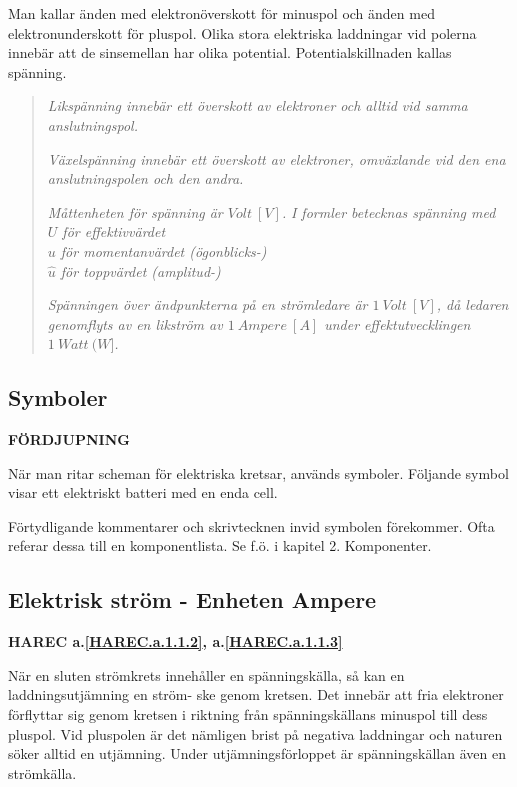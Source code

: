 Man kallar änden med elektronöverskott för minuspol och änden med
elektronunderskott för pluspol. Olika stora elektriska laddningar vid polerna
innebär att de sinsemellan har olika potential. Potentialskillnaden kallas
spänning.

\begin{quote}
\emph{Likspänning innebär ett överskott av elektroner och alltid vid samma
anslutningspol.}

\emph{Växelspänning innebär ett överskott av elektroner, omväxlande vid den ena
anslutningspolen och den andra.}

\emph{Måttenheten för spänning är \(Volt\ [V]\).}
\emph{I formler betecknas spänning med} \\
\emph{\(U\) för effektivvärdet} \\
\emph{\(u\) för momentanvärdet (ögonblicks-)} \\
\emph{\(\hat{u}\) för toppvärdet (amplitud-)}

\emph{Spänningen över ändpunkterna på en strömledare är \(1\ Volt\ [V]\), då ledaren
genomflyts av en likström av \(1\ Ampere\ [A]\) under effektutvecklingen \(1\ Watt\ (W]\).}
\end{quote}

\subsection{Symboler}
\textbf{FÖRDJUPNING}

När man ritar scheman för elektriska kretsar, används symboler. Följande symbol
visar ett elektriskt batteri med en enda cell.

Förtydligande kommentarer och skrivtecknen invid symbolen förekommer. Ofta
referar dessa till en komponentlista. Se f.ö. i kapitel 2. Komponenter.

\subsection{Elektrisk ström - Enheten Ampere}
\textbf{HAREC a.\ref{HAREC.a.1.1.2}\label{myHAREC.a.1.1.2a}, a.\ref{HAREC.a.1.1.3}\label{myHAREC.a.1.1.3a}}

När en sluten strömkrets innehåller en spänningskälla, så kan en
laddningsutjämning en ström- ske genom kretsen. Det innebär att fria elektroner
förflyttar sig genom kretsen i riktning från spänningskällans minuspol till
dess pluspol. Vid pluspolen är det nämligen brist på negativa laddningar och
naturen söker alltid en utjämning. Under utjämningsförloppet är spänningskällan
även en strömkälla.

